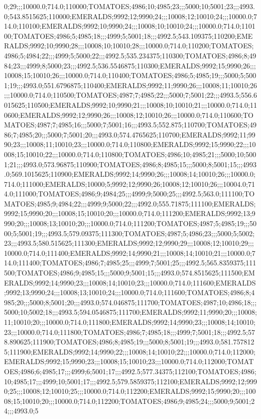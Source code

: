 0;29;;;10000.0;714.0;110000;TOMATOES;4986;10;4985;23;;;5000;10;5001;23;;;4993.0;543.8515625;110000;EMERALDS;9992;12;9990;24;;;10008;12;10010;24;;;10000.0;714.0;110100;EMERALDS;9992;10;9990;24;;;10008;10;10010;24;;;10000.0;714.0;110100;TOMATOES;4986;5;4985;18;;;4999;5;5001;18;;;4992.5;543.109375;110200;EMERALDS;9992;10;9990;28;;;10008;10;10010;28;;;10000.0;714.0;110200;TOMATOES;4986;5;4984;22;;;4999;5;5000;22;;;4992.5;535.234375;110300;TOMATOES;4986;8;4984;23;;;4999;8;5000;23;;;4992.5;536.5546875;110300;EMERALDS;9992;15;9990;26;;;10008;15;10010;26;;;10000.0;714.0;110400;TOMATOES;4986;5;4985;19;;;5000;5;5001;19;;;4993.0;551.6796875;110400;EMERALDS;9992;11;9990;26;;;10008;11;10010;26;;;10000.0;714.0;110500;TOMATOES;4987;7;4985;22;;;5000;7;5001;22;;;4993.5;556.6015625;110500;EMERALDS;9992;10;9990;21;;;10008;10;10010;21;;;10000.0;714.0;110600;EMERALDS;9992;12;9990;26;;;10008;12;10010;26;;;10000.0;714.0;110600;TOMATOES;4987;7;4985;16;;;5000;7;5001;16;;;4993.5;552.875;110700;TOMATOES;4986;7;4985;20;;;5000;7;5001;20;;;4993.0;574.4765625;110700;EMERALDS;9992;11;9990;23;;;10008;11;10010;23;;;10000.0;714.0;110800;EMERALDS;9992;15;9990;22;;;10008;15;10010;22;;;10000.0;714.0;110800;TOMATOES;4986;10;4985;21;;;5000;10;5001;21;;;4993.0;573.96875;110900;TOMATOES;4986;8;4985;15;;;5000;8;5001;15;;;4993.0;569.1015625;110900;EMERALDS;9992;14;9990;26;;;10008;14;10010;26;;;10000.0;714.0;111000;EMERALDS;10000;5;9992;12;9990;26;10008;12;10010;26;;;10004.0;714.0;111000;TOMATOES;4986;9;4984;25;;;4999;9;5000;25;;;4992.5;563.0;111100;TOMATOES;4985;9;4984;22;;;4999;9;5000;22;;;4992.0;555.71875;111100;EMERALDS;9992;15;9990;20;;;10008;15;10010;20;;;10000.0;714.0;111200;EMERALDS;9992;13;9990;20;;;10008;13;10010;20;;;10000.0;714.0;111200;TOMATOES;4987;5;4985;19;;;5000;5;5001;19;;;4993.5;579.09375;111300;TOMATOES;4987;5;4986;23;;;5000;5;5002;23;;;4993.5;580.515625;111300;EMERALDS;9992;12;9990;29;;;10008;12;10010;29;;;10000.0;714.0;111400;EMERALDS;9992;14;9990;21;;;10008;14;10010;21;;;10000.0;714.0;111400;TOMATOES;4986;7;4985;25;;;4999;7;5001;25;;;4992.5;565.8359375;111500;TOMATOES;4986;9;4985;15;;;5000;9;5001;15;;;4993.0;574.8515625;111500;EMERALDS;9992;14;9990;23;;;10008;14;10010;23;;;10000.0;714.0;111600;EMERALDS;9992;13;9990;24;;;10008;13;10010;24;;;10000.0;714.0;111600;TOMATOES;4986;8;4985;20;;;5000;8;5001;20;;;4993.0;574.046875;111700;TOMATOES;4987;10;4986;18;;;5000;10;5002;18;;;4993.5;594.0546875;111700;EMERALDS;9992;11;9990;20;;;10008;11;10010;20;;;10000.0;714.0;111800;EMERALDS;9992;14;9990;23;;;10008;14;10010;23;;;10000.0;714.0;111800;TOMATOES;4986;7;4985;18;;;4999;7;5001;18;;;4992.5;578.890625;111900;TOMATOES;4986;8;4985;19;;;5000;8;5001;19;;;4993.0;581.7578125;111900;EMERALDS;9992;14;9990;22;;;10008;14;10010;22;;;10000.0;714.0;112000;EMERALDS;9992;15;9990;23;;;10008;15;10010;23;;;10000.0;714.0;112000;TOMATOES;4986;6;4985;17;;;4999;6;5001;17;;;4992.5;577.34375;112100;TOMATOES;4986;10;4985;17;;;4999;10;5001;17;;;4992.5;579.5859375;112100;EMERALDS;9992;12;9990;25;;;10008;12;10010;25;;;10000.0;714.0;112200;EMERALDS;9992;15;9990;20;;;10008;15;10010;20;;;10000.0;714.0;112200;TOMATOES;4986;9;4985;24;;;5000;9;5001;24;;;4993.0;5